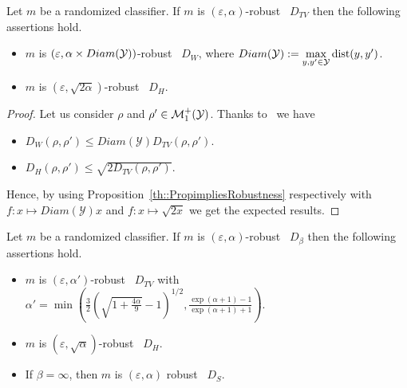 \begin{prop}
\label{prop:LinkTV-Wass}
Let $m $ be a randomized classifier. If $m $ is $(\varepsilon, \alpha)$-robust \wrt~$D_{TV}$ then the following assertions hold. 
\begin{itemize}
    \item $m $ is $\left(\varepsilon, \alpha \times Diam\left( \YY \right) \right)$-robust \wrt~$D_{W}$, where $Diam\left( \YY \right) := \max\limits_{y,y' \in \YY} \dist(y,y')$.
     \item $m $ is $\left(\varepsilon, \sqrt{2 \alpha} \right)$-robust \wrt~$D_{H}$.
\end{itemize} 
\end{prop}
\begin{proof}
Let us consider $\rho$ and $\rho' \in \mathcal{M}^+_1\left(\YY\right)$. Thanks to~\cite{AGibbsMetrics2002} we have
\begin{itemize}
    \item $D_W(\rho,\rho') \leq Diam(\mathcal{Y}) D_{TV}(\rho,\rho')$.
    \item $D_H(\rho,\rho') \leq  \sqrt{2 D_{TV}(\rho,\rho')}$.
\end{itemize}
Hence, by using Proposition~\ref{th::PropimpliesRobustness} respectively with $f: x \mapsto Diam(\mathcal{Y}) x$ and  $f: x \mapsto \sqrt{2x}$ we get the expected results.
\end{proof}

\begin{prop}
\label{prop:LinkRenyiOthers}
Let $m $ be a randomized classifier. If $m $ is $(\varepsilon, \alpha)$-robust \wrt~$D_{\beta}$ then the following assertions hold. 
\begin{itemize}
\item $m $ is $(\varepsilon, \alpha')$-robust \wrt~$D_{TV}$ with $\alpha' = \min \left(\frac{3}{2}\left(\sqrt{1 + \frac{4\alpha}{9}} - 1\right)^{1/2}, \frac{\exp(\alpha +1) -1}{\exp(\alpha +1) +1}\right)$.
\item $m $ is $(\varepsilon, \sqrt{\alpha})$-robust \wrt~$D_H$.
\item If $\beta =\infty$, then $m $ is $(\varepsilon, \alpha)$ robust \wrt~$D_S$.
\end{itemize}
\end{prop}

